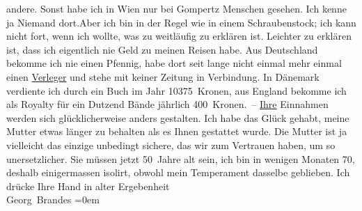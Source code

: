\begin{ledgroupsized}[t]{13cm}
                    andere. Sonst habe ich in Wien nur bei Gompertz Menschen gesehen. Ich kenne {\pb}ja Niemand dort.\hspace*{2em}Aber ich bin in der Regel wie in einem
                    Schraubenstock; ich kann nicht fort, wenn ich wollte, was zu weitläufig zu
                    erklären ist. Leichter zu erklären ist, dass ich eigentlich nie Geld zu meinen
                    Reisen habe. Aus Deutschland bekomme ich nie
                    einen Pfennig, habe dort seit lange nicht einmal mehr einmal einen \uline{Verleger} und stehe mit keiner Zeitung in Verbindung.
                    In Dänemark verdiente ich durch ein Buch im
                    Jahr 10375 Kronen, aus England bekomme ich als
                    Royalty für ein Dutzend Bände jährlich 400 Kronen. – \uline{Ihre} Einnahmen werden sich glücklicherweise anders gestalten.\pend
           \pstart
           Ich habe das Glück gehabt, meine Mutter etwas länger zu behalten als es Ihnen gestattet wurde. Die
                    Mutter ist ja vielleicht das einzige unbedingt sichere, das wir zum Vertrauen
                    haben, um so unersetzlicher. Sie müssen jetzt 50 Jahre alt sein, ich bin in
                    wenigen Monaten 70, deshalb einigermassen isolirt, obwohl mein Temperament
                    dasselbe geblieben.\pend
           \pstart
           Ich drücke Ihre Hand in alter Ergebenheit{\\[\baselineskip]}\spacefill\mbox{Georg Brandes}\pend
           \leftskip=0em{}\endnumbering{}\end{ledgroupsized}  \newcommand{\dateiname}{L02040}\newcommand{\titel}{Georg Brandes an Arthur Schnitzler, 19. 10. 1911}\newcommand{\editorInnen}{Martin Anton Müller und Gerd-Hermann Susen}
      